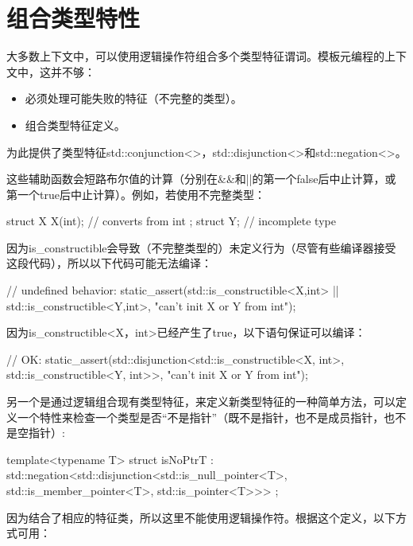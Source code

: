 \section{组合类型特性}

大多数上下文中，可以使用逻辑操作符组合多个类型特征谓词。模板元编程的上下文中，这并不够：

\begin{itemize}
\item 
必须处理可能失败的特征（不完整的类型）。

\item 
组合类型特征定义。
\end{itemize}

为此提供了类型特征std::conjunction<>，std::disjunction<>和std::negation<>。

这些辅助函数会短路布尔值的计算（分别在\&\&和||的第一个false后中止计算，或第一个true后中止计算）。例如，若使用不完整类型：

\begin{cpp}
struct X {
	X(int); // converts from int
};
struct Y; // incomplete type
\end{cpp}

因为is\_constructible会导致（不完整类型的）未定义行为（尽管有些编译器接受这段代码），所以以下代码可能无法编译：

\begin{cpp}
// undefined behavior:
static_assert(std::is_constructible<X,int>{}
				|| std::is_constructible<Y,int>{},
			"can't init X or Y from int");
\end{cpp}

因为is\_constructible<X，int>已经产生了true，以下语句保证可以编译：

\begin{cpp}
// OK:
static_assert(std::disjunction<std::is_constructible<X, int>,
								std::is_constructible<Y, int>>{},
			"can't init X or Y from int");
\end{cpp}

另一个是通过逻辑组合现有类型特征，来定义新类型特征的一种简单方法，可以定义一个特性来检查一个类型是否“不是指针”（既不是指针，也不是成员指针，也不是空指针）:

\begin{cpp}
template<typename T>
struct isNoPtrT : std::negation<std::disjunction<std::is_null_pointer<T>,
												std::is_member_pointer<T>,
												std::is_pointer<T>>>
{
};
\end{cpp}

因为结合了相应的特征类，所以这里不能使用逻辑操作符。根据这个定义，以下方式可用：

